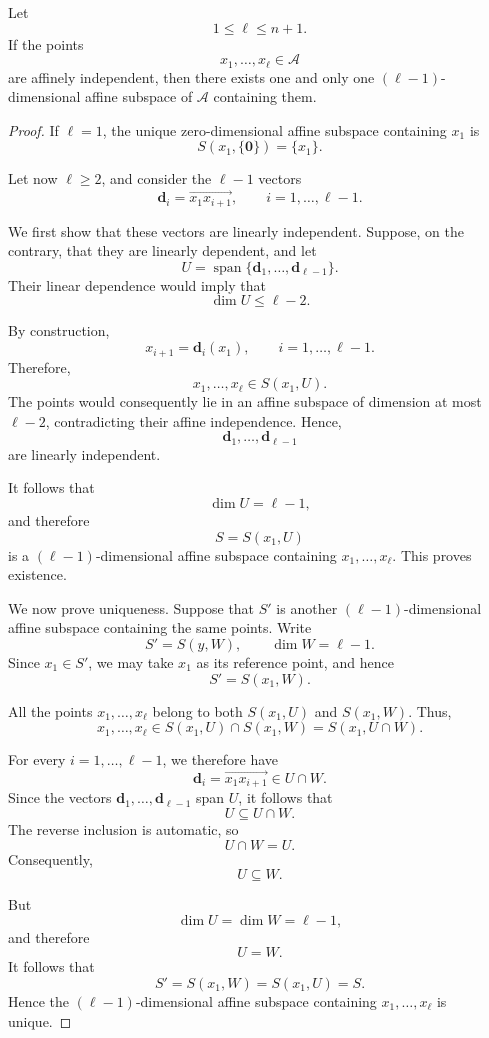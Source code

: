 \documentclass[12pt]{article}
\begin{document}
\begin{proposition}
Let
\[
1\leq \ell\leq n+1.
\]
If the points
\[
x_1,\ldots,x_\ell\in \mathcal A
\]
are affinely independent, then there exists one and only one
\((\ell-1)\)-dimensional affine subspace of \(\mathcal A\) containing them.
\end{proposition}

\begin{proof}
If \(\ell=1\), the unique zero-dimensional affine subspace containing
\(x_1\) is
\[
S(x_1,\{\mathbf 0\})=\{x_1\}.
\]

Let now \(\ell\geq2\), and consider the \(\ell-1\) vectors
\[
\mathbf d_i=\overrightarrow{x_1x_{i+1}},
\qquad i=1,\ldots,\ell-1.
\]

We first show that these vectors are linearly independent. Suppose,
on the contrary, that they are linearly dependent, and let
\[
U=\operatorname{span}
\{\mathbf d_1,\ldots,\mathbf d_{\ell-1}\}.
\]
Their linear dependence would imply that
\[
\dim U\leq \ell-2.
\]

By construction,
\[
x_{i+1}=\mathbf d_i(x_1),
\qquad i=1,\ldots,\ell-1.
\]
Therefore,
\[
x_1,\ldots,x_\ell\in S(x_1,U).
\]
The points would consequently lie in an affine subspace of dimension
at most \(\ell-2\), contradicting their affine independence. Hence,
\[
\mathbf d_1,\ldots,\mathbf d_{\ell-1}
\]
are linearly independent.

It follows that
\[
\dim U=\ell-1,
\]
and therefore
\[
S=S(x_1,U)
\]
is a \((\ell-1)\)-dimensional affine subspace containing
\(x_1,\ldots,x_\ell\). This proves existence.

We now prove uniqueness. Suppose that \(S'\) is another
\((\ell-1)\)-dimensional affine subspace containing the same points.
Write
\[
S'=S(y,W),
\qquad
\dim W=\ell-1.
\]
Since \(x_1\in S'\), we may take \(x_1\) as its reference point, and
hence
\[
S'=S(x_1,W).
\]

All the points \(x_1,\ldots,x_\ell\) belong to both \(S(x_1,U)\) and
\(S(x_1,W)\). Thus,
\[
x_1,\ldots,x_\ell
\in
S(x_1,U)\cap S(x_1,W)
=
S(x_1,U\cap W).
\]

For every \(i=1,\ldots,\ell-1\), we therefore have
\[
\mathbf d_i
=
\overrightarrow{x_1x_{i+1}}
\in U\cap W.
\]
Since the vectors \(\mathbf d_1,\ldots,\mathbf d_{\ell-1}\) span \(U\),
it follows that
\[
U\subseteq U\cap W.
\]
The reverse inclusion is automatic, so
\[
U\cap W=U.
\]
Consequently,
\[
U\subseteq W.
\]

But
\[
\dim U=\dim W=\ell-1,
\]
and therefore
\[
U=W.
\]
It follows that
\[
S'=S(x_1,W)=S(x_1,U)=S.
\]
Hence the \((\ell-1)\)-dimensional affine subspace containing
\(x_1,\ldots,x_\ell\) is unique.
\end{proof}
\end{document}
